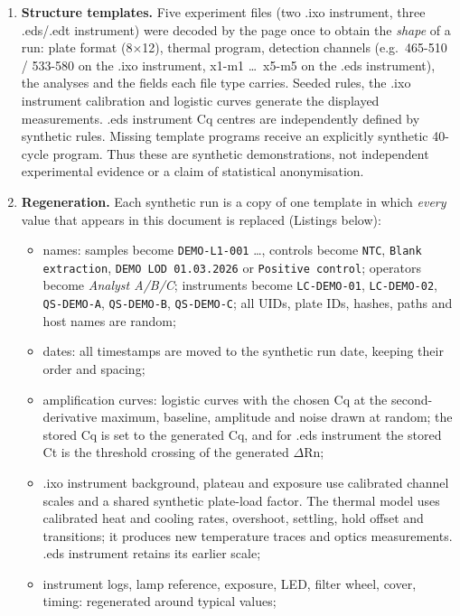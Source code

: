 \begin{enumerate}
\item \textbf{Structure templates.} Five experiment files (two .ixo instrument, three .eds/.edt instrument) were decoded by the page
      once to obtain the \emph{shape} of a run: plate format (8$\times$12), thermal program, detection channels
      (e.g.\ 465-510 / 533-580 on the .ixo instrument, x1-m1 \dots\ x5-m5 on the .eds instrument), the analyses and the fields each file type
      carries. Seeded rules, the .ixo instrument calibration and logistic curves generate the displayed measurements.
      .eds instrument Cq centres are independently defined by synthetic rules. Missing template programs receive an explicitly synthetic 40-cycle program. Thus these are synthetic demonstrations, not
      independent experimental evidence or a claim of statistical anonymisation.
\item \textbf{Regeneration.} Each synthetic run is a copy of one template in which \emph{every} value that appears in this document
      is replaced (Listings below):
      \begin{itemize}
      \item names: samples become \texttt{DEMO-L1-001} \dots, controls become \texttt{NTC}, \texttt{Blank extraction},
            \texttt{DEMO LOD 01.03.2026} or \texttt{Positive control}; operators become \emph{Analyst A/B/C};
            instruments become \texttt{LC-DEMO-01}, \texttt{LC-DEMO-02}, \texttt{QS-DEMO-A}, \texttt{QS-DEMO-B}, \texttt{QS-DEMO-C};
            all UIDs, plate IDs, hashes, paths and host names are random;
      \item dates: all timestamps are moved to the synthetic run date, keeping their order and spacing;
      \item amplification curves: logistic curves with the chosen Cq at the second-derivative maximum, baseline, amplitude and noise
            drawn at random; the stored Cq is set to the generated Cq, and for .eds instrument the stored Ct is the threshold crossing
            of the generated $\Delta$Rn;
      \item .ixo instrument background, plateau and exposure use calibrated channel scales and a shared synthetic plate-load
            factor. The thermal model uses calibrated heat and cooling rates, overshoot, settling, hold offset and transitions;
            it produces new temperature traces and optics measurements. .eds instrument retains its earlier scale;
      \item instrument logs, lamp reference, exposure, LED, filter wheel, cover, timing: regenerated around typical values;

\end{itemize}
\end{enumerate}
